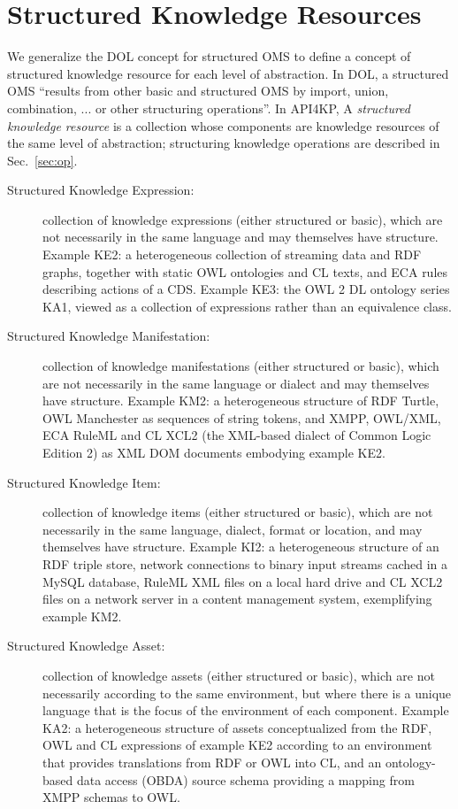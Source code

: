 \documentclass[runningheads]{llncs}
\begin{document}
\section{Structured Knowledge Resources}
\label{sec:structure}
We generalize the DOL concept for structured OMS to define a concept of structured knowledge resource for each level of abstraction. In DOL, a structured OMS ``results from other basic and structured OMS by import, union, combination, ... or other structuring operations''.
In API4KP, A \emph{structured knowledge resource} is a collection whose components are knowledge resources of the same level of abstraction; structuring knowledge operations are described in Sec.~\ref{sec:op}.
\begin{description}
\item[Structured Knowledge Expression:] collection of knowledge expressions (either structured or basic), which are not necessarily in the same language and may themselves have structure. Example KE2: a heterogeneous collection of streaming data and RDF graphs, together with static OWL ontologies and CL texts, and ECA rules describing actions of a CDS. Example KE3: the OWL 2 DL ontology series KA1, viewed as a collection of expressions rather than an equivalence class.
\item[Structured Knowledge Manifestation:] collection of knowledge manifestations (either structured or basic), which are not necessarily in the same language or dialect and may themselves have structure. Example KM2: a heterogeneous structure of RDF Turtle, OWL Manchester as sequences of string tokens, and XMPP, OWL/XML, ECA RuleML and CL XCL2 (the XML-based dialect of Common Logic Edition 2) as XML DOM documents embodying example KE2.
\item[Structured Knowledge Item:] collection of knowledge items  (either structured or basic), which are not necessarily in the same language, dialect, format or location, and may themselves have structure. Example KI2:  a heterogeneous structure of an RDF triple store, network connections to binary input streams cached in a MySQL database, RuleML XML files on a local hard drive and CL XCL2 files on a network server in a content management system, exemplifying example KM2.
\item[Structured Knowledge Asset:] collection of knowledge assets  (either structured or basic), which are not necessarily according to the same environment, but where there is a unique language that is the focus of the environment of each component. Example KA2: a heterogeneous structure of assets conceptualized from the RDF, OWL and CL expressions of example KE2 according to an environment that provides translations from RDF or OWL into CL, and an ontology-based data access (OBDA) source schema providing a mapping from XMPP schemas to OWL.
\end{description}
\end{document}
